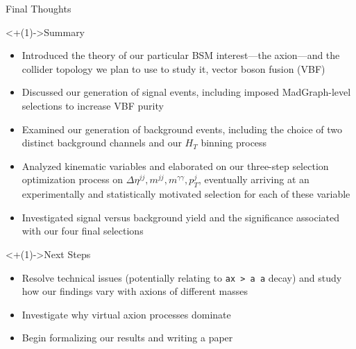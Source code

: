 \documentclass[]{beamer}
\begin{document}
\begin{frame}{Final Thoughts}
    \begin{block}<+(1)->{Summary}
        \begin{itemize}[<+(1)->]
            \item Introduced the theory of our particular BSM interest---the axion---and the collider topology we plan to use to study it, vector boson fusion (VBF)
            \item Discussed our generation of signal events, including imposed MadGraph-level selections to increase VBF purity
            \item Examined our generation of background events, including the choice of two distinct background channels and our $H_T$ binning process
            \item Analyzed kinematic variables and elaborated on our three-step selection optimization process on $\Delta \eta^{jj}, m^{jj}, m^{\gamma \gamma}, p_T^j$, eventually arriving at an experimentally and statistically motivated selection for each of these variable
            \item Investigated signal versus background yield and the significance associated with our four final selections
        \end{itemize}
    \end{block}
    
    \smallskip
    
    \begin{block}<+(1)->{Next Steps}
            \begin{itemize}[<+(1)->]
                \item Resolve technical issues (potentially relating to \texttt{ax > a a} decay) and study how our findings vary with axions of different masses
                \item Investigate why virtual axion processes dominate
                \item Begin formalizing our results and writing a paper  
            \end{itemize}
    \end{block}
\end{frame}
\end{document}
